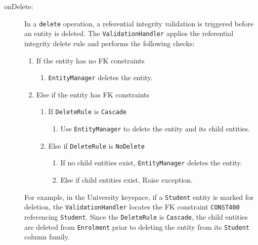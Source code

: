 \begin{description}
	\item[onDelete:] 
		In a \texttt{delete} operation, a referential
		integrity validation is triggered before an entity is deleted.  The
		\texttt{ValidationHandler} applies the referential integrity delete rule
		and performs the following checks:
		\renewcommand{\labelenumii}{\arabic{enumi}. \arabic{enumii}}
		\renewcommand{\labelenumiii}{\arabic{enumi}. \arabic{enumii}. \arabic{enumiii}}
		
		\begin{enumerate}
		  \item If the entity has no \ac{FK} constraints 
		  		\begin{enumerate}
				  \item \texttt{EntityManager} deletes the entity. 
				\end{enumerate}
		  \item Else if the entity has \ac{FK} constraints 
				\begin{enumerate}
		  		  \item If \texttt{DeleteRule} is \texttt{Cascade}
		  		 		\begin{enumerate}
		  		 		   \item Use \texttt{EntityManager}
		  		 		   to delete the entity and its child entities. 
		  		 		\end{enumerate}
		  		  \item Else if \texttt{DeleteRule}  is \texttt{NoDelete}
						\begin{enumerate}
						  \item If no child entities exist,
						  		   \texttt{EntityManager} deletes the entity. 
						  \item Else if child entities exist,
						    		 Raise exception.  
						\end{enumerate}
		  		\end{enumerate}
		\end{enumerate}	
		For example,   in the University keyspace,   if a 
		\texttt{Student} entity is marked for
		deletion,  the \texttt{ValidationHandler} locates the \ac{FK} constraint 
		\texttt{CONST400} referencing \texttt{Student}. 
		Since the \texttt{DeleteRule} is \texttt{Cascade},  
		the child entities are deleted from \texttt{Enrolment} prior to deleting the
		entity from its \texttt{Student} column family.  
	\end{description}
		
